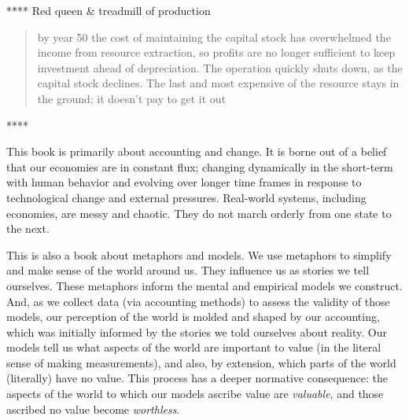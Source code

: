 
****	Red queen \& treadmill of production

\begin{quote}
by year 50 the cost of maintaining the capital stock 
has overwhelmed the income from resource extraction, 
so profits are no longer sufficient to keep investment ahead of depreciation. 
The operation quickly shuts down, as the capital stock declines. 
The last and most expensive of the resource stays in the ground; 
it doesn't pay to get it out~\cite[p.60]{Meadows2008}
\end{quote}
****

This book is primarily about accounting and change.
It is borne out of a belief that our economies are in constant flux;
changing dynamically in the short-term with human behavior
and evolving over longer time frames 
in response to technological change and
external pressures.
Real-world systems, including economies, are messy and chaotic.
They do not march orderly from one state to the next.

This is also a book about metaphors and models.
We use metaphors to simplify and make sense of the world around us.
They influence us as stories we tell ourselves.
These metaphors inform the mental and empirical models we construct.
And, as we collect data (via accounting methods) 
to assess the validity of those models,
our perception of the world is molded and shaped
by our accounting, which was initially informed
by the stories we told ourselves about reality.
Our models tell us what aspects of the world
are important to value 
(in the literal sense of making measurements),
and also, by extension, 
which parts of the world (literally) have no value.
This process has a deeper normative
consequence: the aspects of the world to which our models ascribe
value are \emph{valuable},
and those ascribed no value become \emph{worthless}.


